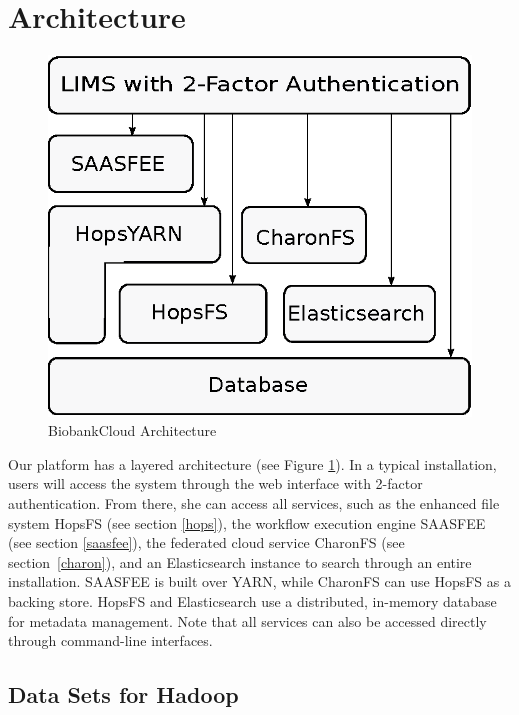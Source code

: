 \section{Architecture}

 \begin{figure}[h]
 \centering
 \includegraphics[scale=0.75]{./imgs/stack.eps}
 \caption{BiobankCloud Architecture}
 \label{fig:arch}
\end{figure}

Our platform has a layered architecture (see Figure \ref{fig:arch}). In a typical installation, users will access the system through the web interface with 2-factor authentication. From there, she can access all services, such as the enhanced file system HopsFS (see section \ref{hops}), the workflow execution engine SAASFEE (see section \ref{saasfee}), the federated cloud service CharonFS (see section~\ref{charon}), and an Elasticsearch instance to search through an entire installation. SAASFEE is built over YARN, while CharonFS can use HopsFS as a backing store. HopsFS and Elasticsearch use a distributed, in-memory database for metadata management. Note that all services can also be accessed directly through command-line interfaces.

\subsection*{Data Sets for Hadoop}

